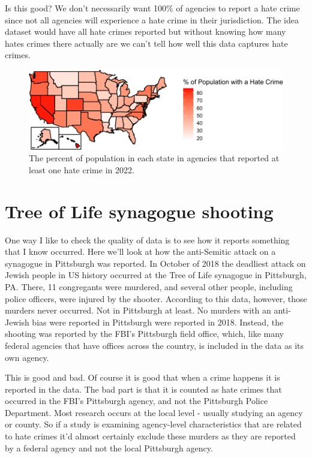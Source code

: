 \documentclass[
  12pt,
  openany]{book}
\begin{document}
Is this good? We don't necessarily want 100\% of agencies to report a hate crime since not all agencies will experience a hate crime in their jurisdiction. The idea dataset would have all hate crimes reported but without knowing how many hates crimes there actually are we can't tell how well this data captures hate crimes.

\begin{figure}

{\centering \includegraphics[width=0.9\linewidth]{09_hate_crime_files/figure-latex/statePercentReportingPop-1} 

}

\caption{The percent of population in each state in agencies that reported at least one hate crime in 2022.}\label{fig:statePercentReportingPop}
\end{figure}

\section{Tree of Life synagogue shooting}\label{treeOfLife}

One way I like to check the quality of data is to see how it reports something that I know occurred. Here we'll look at how the anti-Semitic attack on a synagogue in Pittsburgh was reported. In October of 2018 the deadliest attack on Jewish people in US history occurred at the Tree of Life synagogue in Pittsburgh, PA. There, 11 congregants were murdered, and several other people, including police officers, were injured by the shooter. According to this data, however, those murders never occurred. Not in Pittsburgh at least. No murders with an anti-Jewish bias were reported in Pittsburgh were reported in 2018. Instead, the shooting was reported by the FBI's Pittsburgh field office, which, like many federal agencies that have offices across the country, is included in the data as its own agency.

This is good and bad. Of course it is good that when a crime happens it is reported in the data. The bad part is that it is counted as hate crimes that occurred in the FBI's Pittsburgh agency, and not the Pittsburgh Police Department. Most research occurs at the local level - usually studying an agency or county. So if a study is examining agency-level characteristics that are related to hate crimes it'd almost certainly exclude these murders as they are reported by a federal agency and not the local Pittsburgh agency.
\end{document}

